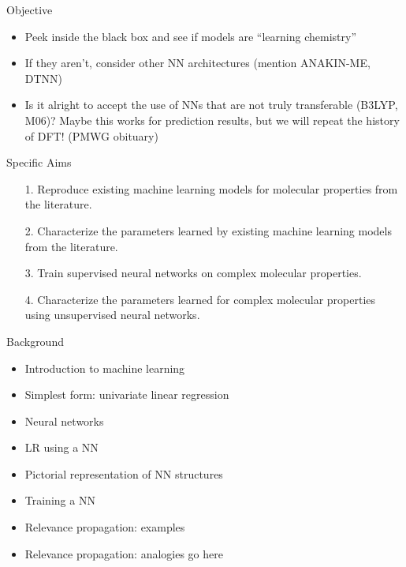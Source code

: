 \documentclass[xetex,compress]{beamer}
\begin{document}
\begin{frame}{Objective}
  \begin{itemize}
  \item Peek inside the black box and see if models are ``learning chemistry''
  \item If they aren't, consider other NN architectures (mention ANAKIN-ME, DTNN)
  \item Is it alright to accept the use of NNs that are not truly transferable (B3LYP, M06)? Maybe this works for prediction results, but we will repeat the history of DFT! (PMWG obituary)
  \end{itemize}
\end{frame}

\begin{frame}{Specific Aims}
  \begin{itemize}
  \item[1.] Reproduce existing machine learning models for molecular properties from the literature.
  \item[2.] Characterize the parameters learned by existing machine learning models from the literature.
  \item[3.] Train supervised neural networks on complex molecular properties.
  \item[4.] Characterize the parameters learned for complex molecular properties using unsupervised neural networks.
  \end{itemize}
\end{frame}

\begin{frame}{Background}
  \begin{itemize}
  \item Introduction to machine learning
  \item Simplest form: univariate linear regression
  \item Neural networks
  \item LR using a NN
  \item Pictorial representation of NN structures
  \item Training a NN
  \item Relevance propagation: examples
  \item Relevance propagation: analogies go here
  \end{itemize}
\end{frame}
\end{document}
